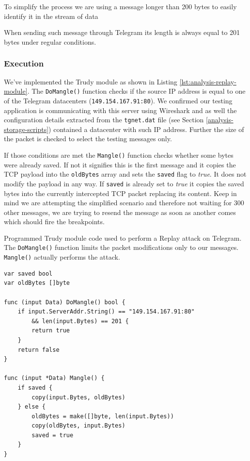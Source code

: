 \documentclass[thesis=M,english]{FITthesis}[2012/10/20]
\begin{document}
\begin{displayquote}
To simplify the process we are using a message longer than 200 bytes to easily identify it in the stream of data
\end{displayquote}

When sending such message through Telegram its length is always equal to 201 bytes under regular conditions.

\subsubsection{Execution}

We've implemented the Trudy module as shown in Listing \ref{lst:analysis-replay-module}. The \texttt{DoMangle()} function checks if the source IP address is equal to one of the Telegram datacenters (\texttt{149.154.167.91:80}). We confirmed our testing application is communicating with this server using Wireshark and as well the configuration details extracted from the \texttt{tgnet.dat} file (see Section \ref{analysis-storage-scripts}) contained a datacenter with such IP address. Further the size of the packet is checked to select the testing messages only.

If those conditions are met the \texttt{Mangle()} function checks whether some bytes were already saved. If not it signifies this is the first message and it copies the TCP payload into the \texttt{oldBytes} array and sets the \texttt{saved} flag to \emph{true}. It does not modify the payload in any way. If \texttt{saved} is already set to \emph{true} it copies the saved bytes into the currently intercepted TCP packet replacing its content. Keep in mind we are attempting the simplified scenario and therefore not waiting for 300 other messages, we are trying to resend the message as soon as another comes which should fire the breakpoints.

\begin{listing}[htb]
\caption{Programmed Trudy module code used to perform a Replay attack on Telegram. The \texttt{DoMangle()} function limits the packet modifications only to our messages. \texttt{Mangle()} actually performs the attack.}
\label{lst:analysis-replay-module}
\begin{verbatim}
var saved bool
var oldBytes []byte

func (input Data) DoMangle() bool {
	if input.ServerAddr.String() == "149.154.167.91:80"
		&& len(input.Bytes) == 201 {
		return true
	}
	return false
}

func (input *Data) Mangle() {
	if saved {
		copy(input.Bytes, oldBytes)
	} else {
		oldBytes = make([]byte, len(input.Bytes))
		copy(oldBytes, input.Bytes)
		saved = true
	}
}
\end{verbatim}
\end{listing}
\end{document}

